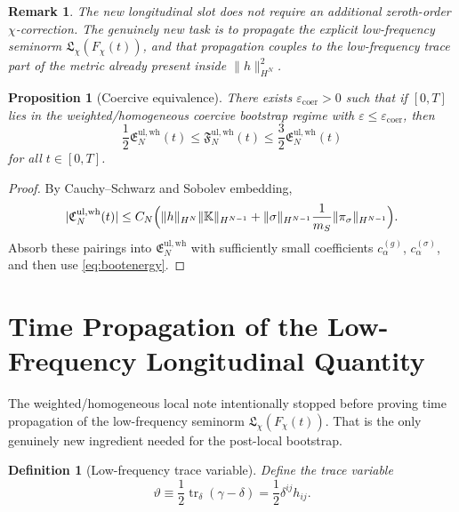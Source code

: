 \documentclass[11pt]{article}
\newtheorem{definition}{Definition}
\newtheorem{proposition}{Proposition}
\newtheorem{remark}{Remark}
\begin{document}
\begin{remark}
The new longitudinal slot does not require an additional zeroth-order \(\chi\)-correction. The genuinely new task is to propagate the explicit low-frequency seminorm \(\mathfrak L_\chi(F_\chi(t))\), and that propagation couples to the low-frequency trace part of the metric already present inside \(\|h\|_{H^N}^2\).
\end{remark}

\begin{proposition}[Coercive equivalence]
\label{prop:equiv}
There exists \(\varepsilon_{\mathrm{coer}}>0\) such that if \([0,T]\) lies in the weighted/homogeneous coercive bootstrap regime with \(\varepsilon\le \varepsilon_{\mathrm{coer}}\), then
\begin{equation}
\frac12 \mathfrak E_N^{\mathrm{ul,wh}}(t)
\le
\mathfrak F_N^{\mathrm{ul,wh}}(t)
\le
\frac32 \mathfrak E_N^{\mathrm{ul,wh}}(t)
\label{eq:Fequiv}
\end{equation}
for all \(t\in[0,T]\).
\end{proposition}

\begin{proof}
By Cauchy--Schwarz and Sobolev embedding,
\[
|\mathfrak C_N^{\mathrm{ul,wh}}(t)|
\le
C_N\Bigl(
\|h\|_{H^N}\|\mathbb K\|_{H^{N-1}}
+
\|\sigma\|_{H^{N-1}}\frac{1}{m_S}\|\pi_\sigma\|_{H^{N-1}}
\Bigr).
\]
Absorb these pairings into \(\mathfrak E_N^{\mathrm{ul,wh}}\) with sufficiently small coefficients \(c_\alpha^{(g)}\), \(c_\alpha^{(\sigma)}\), and then use \eqref{eq:bootenergy}.
\end{proof}

\section{Time Propagation of the Low-Frequency Longitudinal Quantity}

The weighted/homogeneous local note intentionally stopped before proving time propagation of the low-frequency seminorm \(\mathfrak L_\chi(F_\chi(t))\). That is the only genuinely new ingredient needed for the post-local bootstrap.

\begin{definition}[Low-frequency trace variable]
Define the trace variable
\begin{equation}
\vartheta \equiv \frac12 \operatorname{tr}_\delta(\gamma-\delta)
=
\frac12 \delta^{ij}h_{ij}.
\label{eq:vartheta}
\end{equation}
\end{definition}
\end{document}
